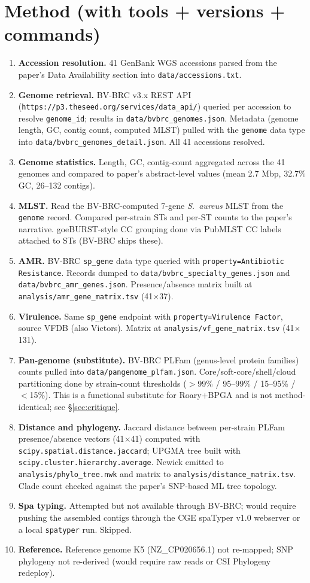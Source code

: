 \documentclass[11pt]{article}
\begin{document}
\section{Method (with tools + versions + commands)}
\begin{enumerate}[leftmargin=1.5em]
\item \textbf{Accession resolution.} 41 GenBank WGS accessions parsed from the paper's Data Availability section into \texttt{data/accessions.txt}.
\item \textbf{Genome retrieval.} BV-BRC v3.x REST API (\texttt{https://p3.theseed.org/services/data\_api/}) queried per accession to resolve \texttt{genome\_id}; results in \texttt{data/bvbrc\_genomes.json}. Metadata (genome length, GC, contig count, computed MLST) pulled with the \texttt{genome} data type into \texttt{data/bvbrc\_genomes\_detail.json}. All 41 accessions resolved.
\item \textbf{Genome statistics.} Length, GC, contig-count aggregated across the 41 genomes and compared to paper's abstract-level values (mean 2.7 Mbp, 32.7\% GC, 26--132 contigs).
\item \textbf{MLST.} Read the BV-BRC-computed 7-gene \emph{S.\ aureus} MLST from the \texttt{genome} record. Compared per-strain STs and per-ST counts to the paper's narrative. goeBURST-style CC grouping done via PubMLST CC labels attached to STs (BV-BRC ships these).
\item \textbf{AMR.} BV-BRC \texttt{sp\_gene} data type queried with \texttt{property=Antibiotic Resistance}. Records dumped to \texttt{data/bvbrc\_specialty\_genes.json} and \texttt{data/bvbrc\_amr\_genes.json}. Presence/absence matrix built at \texttt{analysis/amr\_gene\_matrix.tsv} (41$\times$37).
\item \textbf{Virulence.} Same \texttt{sp\_gene} endpoint with \texttt{property=Virulence Factor}, source VFDB (also Victors). Matrix at \texttt{analysis/vf\_gene\_matrix.tsv} (41$\times$131).
\item \textbf{Pan-genome (substitute).} BV-BRC PLFam (genus-level protein families) counts pulled into \texttt{data/pangenome\_plfam.json}. Core/soft-core/shell/cloud partitioning done by strain-count thresholds ($>$99\% / 95--99\% / 15--95\% / $<$15\%). This is a functional substitute for Roary+BPGA and is not method-identical; see \S\ref{sec:critique}.
\item \textbf{Distance and phylogeny.} Jaccard distance between per-strain PLFam presence/absence vectors (41$\times$41) computed with \texttt{scipy.spatial.distance.jaccard}; UPGMA tree built with \texttt{scipy.cluster.hierarchy.average}. Newick emitted to \texttt{analysis/phylo\_tree.nwk} and matrix to \texttt{analysis/distance\_matrix.tsv}. Clade count checked against the paper's SNP-based ML tree topology.
\item \textbf{Spa typing.} Attempted but not available through BV-BRC; would require pushing the assembled contigs through the CGE spaTyper v1.0 webserver or a local \texttt{spatyper} run. Skipped.
\item \textbf{Reference.} Reference genome K5 (NZ\_CP020656.1) not re-mapped; SNP phylogeny not re-derived (would require raw reads or CSI Phylogeny redeploy).
\end{enumerate}
\end{document}

